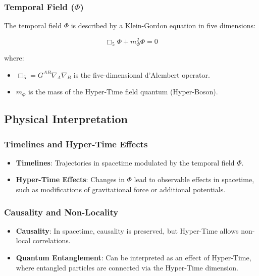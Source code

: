 \documentclass[11pt,a4paper]{article}
\begin{document}
\subsubsection{Temporal Field ($\Phi$)}

The temporal field $\Phi$ is described by a Klein-Gordon equation in five dimensions:

\begin{equation}
\Box_5 \Phi + m_\Phi^2 \Phi = 0
\end{equation}

where:

\begin{itemize}
    \item $\Box_5 = G^{AB} \nabla_A \nabla_B$ is the five-dimensional d'Alembert operator.
    \item $m_\Phi$ is the mass of the Hyper-Time field quantum (Hyper-Boson).
\end{itemize}

\subsection{Physical Interpretation}

\subsubsection{Timelines and Hyper-Time Effects}

\begin{itemize}
    \item \textbf{Timelines}: Trajectories in spacetime modulated by the temporal field $\Phi$.
    \item \textbf{Hyper-Time Effects}: Changes in $\Phi$ lead to observable effects in spacetime, such as modifications of gravitational force or additional potentials.
\end{itemize}

\subsubsection{Causality and Non-Locality}

\begin{itemize}
    \item \textbf{Causality}: In spacetime, causality is preserved, but Hyper-Time allows non-local correlations.
    \item \textbf{Quantum Entanglement}: Can be interpreted as an effect of Hyper-Time, where entangled particles are connected via the Hyper-Time dimension.
\end{itemize}
\end{document}
